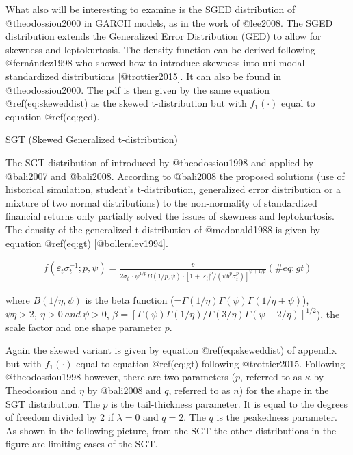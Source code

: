 \documentclass[
]{article}
\begin{document}
\noindent What also will be interesting to examine is the SGED
distribution of @theodossiou2000 in GARCH models, as in the work of
@lee2008. The SGED distribution extends the Generalized Error
Distribution (GED) to allow for skewness and leptokurtosis. The density
function can be derived following @fernández1998 who showed how to
introduce skewness into uni-modal standardized distributions
{[}@trottier2015{]}. It can also be found in @theodossiou2000. The pdf
is then given by the same equation @ref(eq:skeweddist) as the skewed
t-distribution but with \(f_1(\cdot)\) equal to equation @ref(eq:ged).

SGT (Skewed Generalized t-distribution)

\noindent The SGT distribution of introduced by @theodossiou1998 and
applied by @bali2007 and @bali2008. According to @bali2008 the proposed
solutions (use of historical simulation, student's t-distribution,
generalized error distribution or a mixture of two normal distributions)
to the non-normality of standardized financial returns only partially
solved the issues of skewness and leptokurtosis. The density of the
generalized t-distribution of @mcdonald1988 is given by equation
@ref(eq:gt) {[}@bollerslev1994{]}.

\begin{align}
f\left(\varepsilon_{t} \sigma_{t}^{-1} ; p, \psi\right)=\frac{p}{2 \sigma_{t} \ \cdot \psi^{1 / p} B(1 / p, \psi) \cdot\left[1+\left|\varepsilon_{t}\right|^{p} /\left(\psi b^{p} \sigma_{t}^{p}\right)\right]^{\psi+1 / p}}
 (\#eq:gt)
\end{align}

\noindent where \(B(1 / \eta, \psi)\) is the beta function
(=\(\Gamma(1 / \eta) \Gamma(\psi) \Gamma(1 / \eta+\psi)\)),
\(\psi\eta>2,\ \eta>0 \ and \ \psi >0\),
\(\beta = [\Gamma(\psi)\Gamma(1 / \eta)/\Gamma(3 / \eta)\Gamma(\psi - 2/\eta)]^{1/2}\)),
the scale factor and one shape parameter \(p\).

\noindent Again the skewed variant is given by equation
@ref(eq:skeweddist) of appendix but with \(f_1(\cdot)\) equal to
equation @ref(eq:gt) following @trottier2015. Following @theodossiou1998
however, there are two parameters (\(p\), referred to as \(\kappa\) by
Theodossiou and \(\eta\) by @bali2008 and \(q\), referred to as \(n\))
for the shape in the SGT distribution. The \(p\) is the tail-thickness
parameter. It is equal to the degrees of freedom divided by 2 if
\(\lambda = 0\) and \(q = 2\). The \(q\) is the peakedness parameter. As
shown in the following picture, from the SGT the other distributions in
the figure are limiting cases of the SGT.
\end{document}
